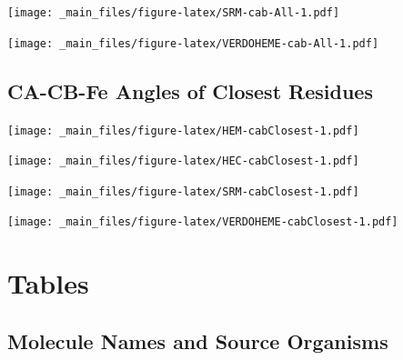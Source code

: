 \documentclass[a4paper, nobind]{templates/ociamthesis}
\let\origfigure\figure
\let\endorigfigure\endfigure
\renewenvironment{figure}[1][2] {
    \expandafter\origfigure\expandafter[H]
} {
    \endorigfigure
}
\begin{document}
\begin{figure}
\centering
\texttt{[image: \_main\_files/figure-latex/SRM-cab-All-1.pdf]}
\caption{\label{fig:SRM-cab-All}SRM: All CA-CB-Fe Angles}
\end{figure}

\begin{figure}
\centering
\texttt{[image: \_main\_files/figure-latex/VERDOHEME-cab-All-1.pdf]}
\caption{\label{fig:VERDOHEME-cab-All}VERDOHEME: All CA-CB-Fe Angles}
\end{figure}

\hypertarget{figs-cabClosest}{%
\section{CA-CB-Fe Angles of Closest Residues}\label{figs-cabClosest}}

\begin{figure}
\centering
\texttt{[image: \_main\_files/figure-latex/HEM-cabClosest-1.pdf]}
\caption{\label{fig:HEM-cabClosest}HEM: CACBFe Angles of Closest Residues}
\end{figure}

\begin{figure}
\centering
\texttt{[image: \_main\_files/figure-latex/HEC-cabClosest-1.pdf]}
\caption{\label{fig:HEC-cabClosest}HEC: CACBFe Angles of Closest Residues}
\end{figure}

\begin{figure}
\centering
\texttt{[image: \_main\_files/figure-latex/SRM-cabClosest-1.pdf]}
\caption{\label{fig:SRM-cabClosest}SRM: CACBFe Angles of Closest Residues}
\end{figure}

\begin{figure}
\centering
\texttt{[image: \_main\_files/figure-latex/VERDOHEME-cabClosest-1.pdf]}
\caption{\label{fig:VERDOHEME-cabClosest}VERDOHEME: CACBFe Angles of Closest Residues}
\end{figure}

\hypertarget{a-tables}{%
\chapter{Tables}\label{a-tables}}

\minitoc

\hypertarget{molOrgSec}{%
\section{Molecule Names and Source Organisms}\label{molOrgSec}}
\end{document}
